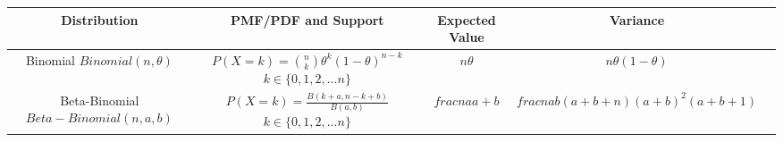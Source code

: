 \documentclass[12pt,]{krantz}
\theoremstyle{definition}
\theoremstyle{definition}
\theoremstyle{definition}
\theoremstyle{remark}
\begin{document}
\begin{center}
\renewcommand{\arraystretch}{3.7}
\begin{tabular}{ccccc}
\textbf{Distribution} & \textbf{PMF/PDF and Support} & \textbf{Expected Value}  & \textbf{Variance}\\
\hline 
\shortstack{Binomial \\ $Binomial(n, \theta)$} & \shortstack{$P(X=k) = \binom{n}{k}\theta^k (1-\theta)^{n-k}$  \\ $k \in \{0, 1, 2, \dots n\}$}& $n\theta$ & $n\theta(1-\theta)$ \\
\hline
\shortstack{Beta-Binomial \\ $Beta-Binomial(n, a, b)$} & \shortstack{$P(X=k) = \frac{B(k+a, n-k+b)}{B(a,b)}$  \\ $k \in \{0, 1, 2, \dots n\}$}& $ frac{n a}{a + b} $ & $frac{n a b (a + b+n)}{(a + b)^2(a+b+1)}$ \\
\hline


\end{tabular}
\end{center}
\end{document}
